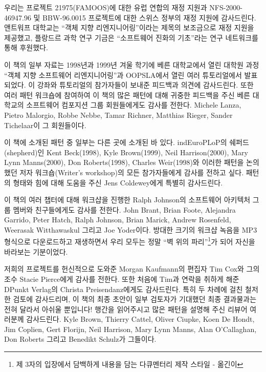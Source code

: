 \documentclass[a4paper,10pt,twoside]{book}
\begin{document}
우리는  프로젝트 21975(FAMOOS)에 대한 유럽 연합의 재정 지원과 NFS-2000-46947.96 및 BBW-96.0015 프로젝트에 대한 스위스 정부의 재정 지원에 감사드린다. 앤트워프 대학교는 ``객체 지향 리엔지니어링''이라는 제목의 보조금으로 재정 지원을 제공했고, 플랑드르 과학 연구 기금은 ``소프트웨어 진화의 기초''라는 연구 네트워크를 통해 후원했다.

이 책의 일부 자료는 1998년과 1999년 겨울 학기에 베른 대학교에서 열린 대학원 과정 ``객체 지향 소프트웨어 리엔지니어링''과 OOPSLA에서 열린 여러 튜토리얼에서 발표되었다. 이 강좌와 튜토리얼의 참가자들이 보내준 피드백과 의견에 감사드린다. 또한 여러 패턴 워크숍에 참여하여 이 책의 많은 패턴에 대해 귀중한 피드백을 주신 베른 대학교의 소프트웨어 컴포지션 그룹 회원들에게도 감사를 전한다. Michele Lanza, Pietro Malorgio, Robbe Nebbe, Tamar Richner, Matthias Rieger, Sander Tichelaar이 그 회원들이다.

이 책에 소개된 패턴 중 일부는 다른 곳에 소개된 바 있다. ind{EuroPLoP}의 쉐퍼드(shepherd)인 Kent Beck(1998), Kyle Brown(1999), Neil Harrison(2000), Mary Lynn Manns(2000), Don Roberts(1998), Charles Weir(1998)와 이러한 패턴을 논의했던 저자 워크숍(Writer's workshop)의 모든 참가자들에게 감사를 전하고 싶다. 패턴의 형태와 힘에 대해 도움을 주신 Jens Coldewey에게 특별히 감사드린다. 

이 책의 여러 챕터에 대해 워크샵을 진행한 Ralph Johnson의 소프트웨어 아키텍처 그룹 멤버와 친구들에게도 감사를 전한다. John Brant, Brian Foote, Alejandra Garrido, Peter Hatch, Ralph Johnson, Brian Marick, Andrew Rosenfeld, Weerasak Witthawaskul 그리고 Joe Yoder이다. 방대한 크기의 워크샵 녹음을 MP3 형식으로 다운로드하고 재생하면서 우리 모두는 정말 ``벽 위의 파리''\footnote{제 3자의 입장에서 담백하게 내용을 담는 다큐멘터리 제작 스타일 - 옮긴이}가 되어 자신을 바라보는 기분이었다.

저희의 프로젝트를 헌신적으로 도와준 Morgan Kaufmann의 편집자 Tim Cox와 그의 조수 Stacie Pierce에게 감사를 전한다. 또한 처음에 Tim과 연락을 취하게 해준 DPunkt Verlag의 Christa Preisendanz에게도 감사드린다. 특히 두 차례에 걸친 철저한 검토에 감사드리며, 이 책의 최종 초안이 일부 검토자가 기대했던 최종 결과물과는 전혀 달라서 아쉬울 뿐입니다! 행간을 읽어주시고 많은 패턴을 설명해 주신 리뷰어 여러분께 감사드린다. Kyle Brown, Thierry Cattel, Oliver Ciupke, Koen De Hondt, Jim Coplien, Gert Florijn, Neil Harrison, Mary Lynn Manns, Alan O'Callaghan, Don Roberts 그리고 Benedikt Schulz가 그들이다.

\ifx\wholebook\relax\else
   
   
   
\end{document}
